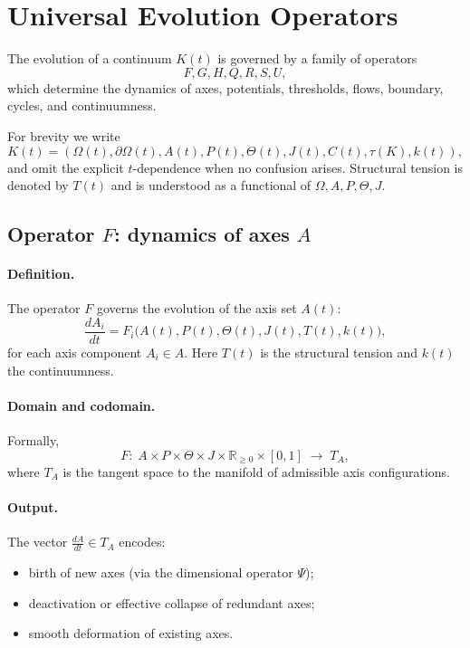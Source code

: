 \section{Universal Evolution Operators}
\label{sec:operators-universal}

The evolution of a continuum \(K(t)\) is governed by a family of operators
\[
  F,G,H,Q,R,S,U,
\]
which determine the dynamics of axes, potentials, thresholds, flows, boundary, cycles, and continuumness.

For brevity we write
\[
  K(t)=(\Omega(t),\partial\Omega(t),A(t),P(t),\Theta(t),J(t),C(t),\tau(K),k(t)),
\]
and omit the explicit \(t\)-dependence when no confusion arises.
Structural tension is denoted by \(T(t)\) and is understood as a functional of \(\Omega,A,P,\Theta,J\).

\subsection{Operator \texorpdfstring{\(F\)}{F}: dynamics of axes \texorpdfstring{\(A\)}{A}}

\paragraph{Definition.}
The operator \(F\) governs the evolution of the axis set \(A(t)\):
\[
  \frac{dA_i}{dt} = F_i\bigl(A(t),P(t),\Theta(t),J(t),T(t),k(t)\bigr),
\]
for each axis component \(A_i\in A\).
Here \(T(t)\) is the structural tension and \(k(t)\) the continuumness.

\paragraph{Domain and codomain.}
Formally,
\[
  F:\; A\times P\times\Theta\times J\times\mathbb{R}_{\ge 0}\times[0,1]
     \;\longrightarrow\; T_A,
\]
where \(T_A\) is the tangent space to the manifold of admissible axis configurations.

\paragraph{Output.}
The vector \(\frac{dA}{dt}\in T_A\) encodes:
\begin{itemize}
  \item birth of new axes (via the dimensional operator \(\Psi\));
  \item deactivation or effective collapse of redundant axes;
  \item smooth deformation of existing axes.
\end{itemize}

